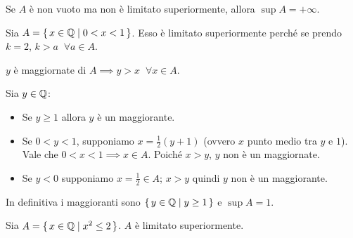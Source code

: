 Se $A$ è non vuoto ma non è limitato superiormente, allora $\sup A = + \infty$.

\begin{example}
Sia $A = \set{x \in \mathbb Q| 0 < x < 1}$.
Esso è limitato superiormente perché se prendo $k = 2$, $k > a \;\; \forall a \in A$.

$y$ è maggiornate di $A \implies y > x \; \; \forall x \in A$.

Sia $y \in \mathbb Q$:
\begin{itemize}
\item Se $y \ge 1$ allora $y$ è un maggiorante.
\item Se $0 < y < 1$, supponiamo $x = \frac{1}{2}(y+1)$ (ovvero $x$ punto medio tra $y$ e $1$). Vale che $0 < x < 1 \implies x \in A$. Poiché $x > y$, $y$ non è un maggiornate.
\item Se $y < 0$ supponiamo $x = \frac{1}{2} \in A$; $x > y$ quindi $y$ non è un maggiorante.
\end{itemize}

In definitiva i maggioranti sono $\set{y \in \mathbb Q| y \ge 1}$ e $\sup A = 1$.
\end{example}

\begin{example}
Sia $A = \set{x \in \mathbb Q| x^2 \le 2}$. $A$ è limitato superiormente.\end{example}

